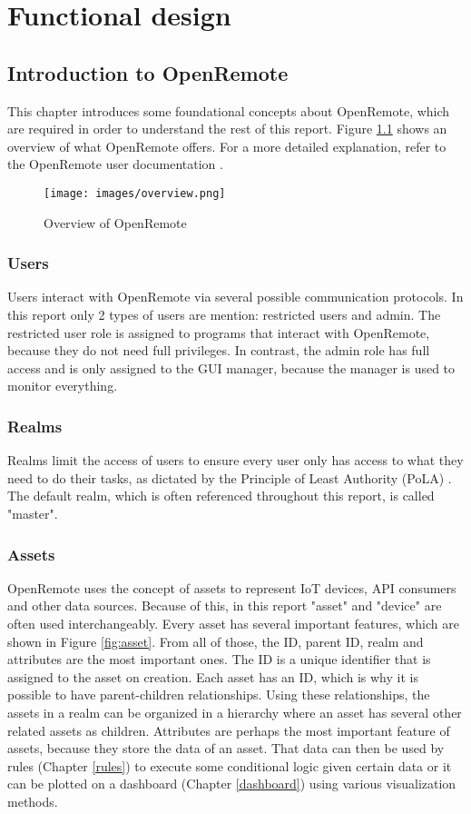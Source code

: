 \chapter{Functional design}
\section{Introduction to OpenRemote}
This chapter introduces some foundational concepts about OpenRemote, which are required in order to understand the rest of this report. Figure \ref{fig:overview} shows an overview of what OpenRemote offers. For a more detailed explanation, refer to the OpenRemote user documentation \cite{openremote-user}.

\begin{figure}[ht]
    \centering
    \texttt{[image: images/overview.png]}
    \caption{Overview of OpenRemote}
    \label{fig:overview}
\end{figure}


\subsection{Users}
Users interact with OpenRemote via several possible communication protocols. In this report only 2 types of users are mention: restricted users and admin. The restricted user role is assigned to programs that interact with OpenRemote, because they do not need full privileges. In contrast, the admin role has full access and is only assigned to the GUI manager, because the manager is used to monitor everything.

\subsection{Realms}
Realms limit the access of users to ensure every user only has access to what they need to do their tasks, as dictated by the Principle of Least Authority (PoLA) \cite{wiki-pola}. The default realm, which is often referenced throughout this report, is called "master".

\subsection{Assets}
OpenRemote uses the concept of assets to represent IoT devices, API consumers and other data sources. Because of this, in this report "asset" and "device" are often used interchangeably. Every asset has several important features, which are shown in Figure \ref{fig:asset}. From all of those, the ID, parent ID, realm and attributes are the most important ones. The ID is a unique identifier that is assigned to the asset on creation. Each asset has an ID, which is why it is possible to have parent-children relationships. Using these relationships, the assets in a realm can be organized in a hierarchy where an asset has several other related assets as children. Attributes are perhaps the most important feature of assets, because they store the data of an asset. That data can then be used by rules (Chapter \ref{rules}) to execute some conditional logic given certain data or it can be plotted on a dashboard (Chapter \ref{dashboard}) using various visualization methods. 

